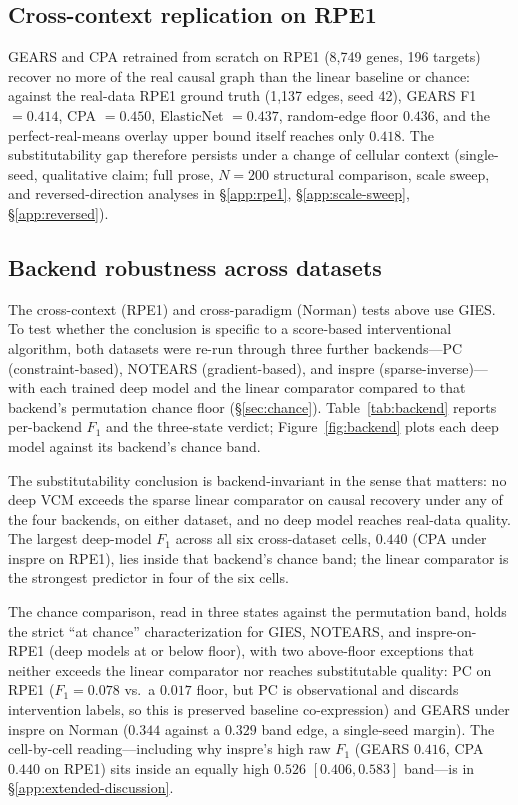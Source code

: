 \documentclass{article}
\theoremstyle{plain}
\theoremstyle{definition}
\theoremstyle{remark}
\begin{document}
\subsection{Cross-context replication on RPE1}
\label{sec:rpe1}
GEARS and CPA retrained from scratch on RPE1 (8{,}749 genes, 196 targets) recover no more of the real causal graph than the linear baseline or chance: against the real-data RPE1 ground truth (1{,}137 edges, seed 42), GEARS F1 $= 0.414$, CPA $= 0.450$, ElasticNet $= 0.437$, random-edge floor $0.436$, and the perfect-real-means overlay upper bound itself reaches only $0.418$. The substitutability gap therefore persists under a change of cellular context (single-seed, qualitative claim; full prose, $N{=}200$ structural comparison, scale sweep, and reversed-direction analyses in \S\ref{app:rpe1}, \S\ref{app:scale-sweep}, \S\ref{app:reversed}).

\subsection{Backend robustness across datasets}
\label{sec:backend-robustness}
The cross-context (RPE1) and cross-paradigm (Norman) tests above use GIES. To test whether the conclusion is specific to a score-based interventional algorithm, both datasets were re-run through three further backends---PC (constraint-based), NOTEARS (gradient-based), and inspre (sparse-inverse)---with each trained deep model and the linear comparator compared to that backend's permutation chance floor (\S\ref{sec:chance}). Table~\ref{tab:backend} reports per-backend $F_1$ and the three-state verdict; Figure~\ref{fig:backend} plots each deep model against its backend's chance band.

The substitutability conclusion is backend-invariant in the sense that matters: no deep VCM exceeds the sparse linear comparator on causal recovery under any of the four backends, on either dataset, and no deep model reaches real-data quality. The largest deep-model $F_1$ across all six cross-dataset cells, $0.440$ (CPA under inspre on RPE1), lies inside that backend's chance band; the linear comparator is the strongest predictor in four of the six cells.

The chance comparison, read in three states against the permutation band, holds the strict ``at chance'' characterization for GIES, NOTEARS, and inspre-on-RPE1 (deep models at or below floor), with two above-floor exceptions that neither exceeds the linear comparator nor reaches substitutable quality: PC on RPE1 ($F_1 = 0.078$ vs.\ a $0.017$ floor, but PC is observational and discards intervention labels, so this is preserved baseline co-expression) and GEARS under inspre on Norman ($0.344$ against a $0.329$ band edge, a single-seed margin). The cell-by-cell reading---including why inspre's high raw $F_1$ (GEARS $0.416$, CPA $0.440$ on RPE1) sits inside an equally high $0.526$ $[0.406, 0.583]$ band---is in \S\ref{app:extended-discussion}.
\end{document}
